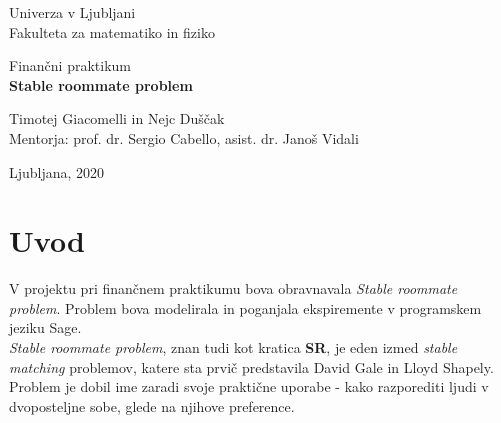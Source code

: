 \documentclass[12pt, a4paper]{article}
\begin{document}
\begin{titlepage}
\begin{center}

\large
Univerza v Ljubljani\\
\normalsize
Fakulteta za matematiko in fiziko\\

\vspace{5 cm} 

\large
Finančni praktikum \\


\vspace{0.5cm}
\LARGE
\textbf{Stable roommate problem}

\vspace{0.5 cm}

\large
Timotej Giacomelli in Nejc Duščak\\


\vspace{1.5cm}
\normalsize
Mentorja: prof. dr. Sergio Cabello, asist. dr. Janoš Vidali
\vspace{3cm}


\vfill

\large Ljubljana, 2020

\end{center}
\end{titlepage}


\newpage

\tableofcontents
\vspace{22mm}

\newpage

\section{Uvod}
V projektu pri finančnem praktikumu bova obravnavala \textit{Stable roommate problem}.  Problem bova modelirala in poganjala ekspiremente v programskem jeziku Sage.\\

\textit{Stable roommate problem}, znan tudi kot kratica \textbf{SR}, je eden izmed \textit{stable matching} problemov, katere sta prvič predstavila David Gale in Lloyd Shapely. Problem je dobil ime zaradi svoje praktične uporabe - kako razporediti ljudi v dvoposteljne sobe, glede na njihove preference.\\
\end{document}
